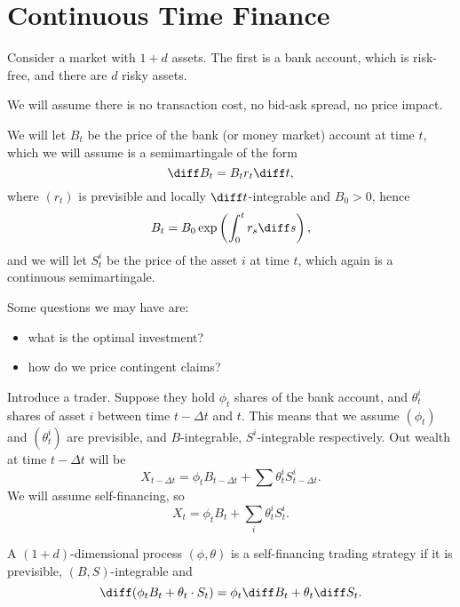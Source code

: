 \documentclass[12pt]{article}
\begin{document}

\newpage

\section{Continuous Time Finance}%
\label{sec:ctf}

Consider a market with $1 + d$ assets. The first is a bank account, which is risk-free, and there are $d$ risky assets.

We will assume there is no transaction cost, no bid-ask spread, no price impact.

We will let $B_t$ be the price of the bank (or money market) account at time $t$, which we will assume is a semimartingale of the form
\[
\diff B_t = B_t r_t \diff t,
\]
where $(r_t)$ is previsible and locally $\diff t$-integrable and $B_0 > 0$, hence
\[
B_t = B_0 \exp \left( \int_0^{t} r_s \diff s \right),
\]
and we will let $S_t^{i}$ be the price of the asset $i$ at time $t$, which again is a continuous semimartingale.

Some questions we may have are:
\begin{itemize}
	\item what is the optimal investment?
	\item how do we price contingent claims?
\end{itemize}

Introduce a trader. Suppose they hold $\phi_t$ shares of the bank account, and $\theta^{i}_t$ shares of asset $i$ between time $t - \Delta t$ and $t$. This means that we assume $(\phi_t)$ and $(\theta_t^{i})$ are previsible, and $B$-integrable, $S^{i}$-integrable respectively. Out wealth at time $t - \Delta t$ will be
\[
X_{t - \Delta t} = \phi_t B_{t - \Delta t} + \sum \theta_t^{i} S_{t - \Delta t}^{i}.
\]
We will assume self-financing, so
\[
X_t = \phi_t B_t + \sum_i \theta_t^{i} S_t^{i}.
\]
\begin{definition}
	A $(1 + d)$-dimensional process $(\phi, \theta)$ is a self-financing trading strategy if it is previsible, $(B, S)$-integrable and
	\[
	\diff (\phi_t B_t + \theta_t \cdot S_t) = \phi_t \diff B_t + \theta_t \diff S_t.
	\]
\end{definition}
\end{document}
